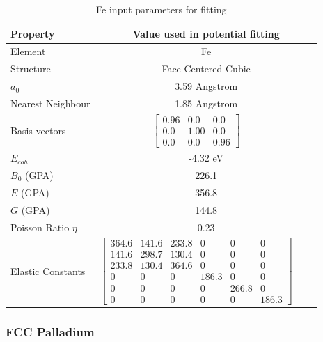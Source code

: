\begin{table}[ht]
\renewcommand{\arraystretch}{1.2}
\begin{tabular}{lccc}
\hline\hline
Property & \multicolumn{3}{c}{Value used in potential fitting} \\
\hline\hline
Element & \multicolumn{3}{c}{Fe}\\
Structure             & \multicolumn{3}{c}{Face Centered Cubic}\\
$a_0$                 & \multicolumn{3}{c}{3.59 Angstrom}\\
Nearest Neighbour     & \multicolumn{3}{c}{1.85 Angstrom}\\
Basis vectors         & $\begin{bmatrix} 0.96 & 0.0 & 0.0 \\ 0.0 & 1.00 & 0.0 \\ 0.0 & 0.0 & 0.96  \end{bmatrix}$ \\
$E_{coh}$             & \multicolumn{3}{c}{-4.32 eV}   \\
$B_0$ (GPA)           & \multicolumn{3}{c}{226.1}   \\
$E$ (GPA)             & \multicolumn{3}{c}{356.8}   \\
$G$ (GPA)             & \multicolumn{3}{c}{144.8}   \\
Poisson Ratio $\eta$  & \multicolumn{3}{c}{0.23}   \\
Elastic Constants     & $\begin{bmatrix} 364.6 & 141.6 & 233.8 & 0 & 0 & 0 \\ 141.6 & 298.7 & 130.4 & 0 & 0 & 0 \\ 233.8 & 130.4 & 364.6 & 0 & 0 & 0 \\ 0 & 0 & 0 & 186.3 & 0 & 0 \\ 0 & 0 & 0 & 0 & 266.8 & 0 \\ 0 & 0 & 0 & 0 & 0 & 186.3 \end{bmatrix}$ \\
\hline\hline
\end{tabular}
\caption{Fe input parameters for fitting}
\label{table:feinputparameters}
\end{table}








\FloatBarrier
\subsubsection{FCC Palladium}

